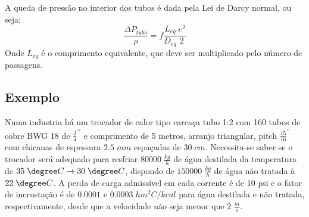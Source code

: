 A queda de pressão no interior dos tubos é dada pela Lei de Darcy normal, ou seja:
\begin{equation}\label{eq:queda_pressao_tubo}
    \frac{\Delta P_{tubo}}{\rho } = f \frac{L_{eq} }{D_{eq} }\frac{\upsilon ^{2} }{2}
\end{equation}
Onde \(L_{eq}\) é o comprimento equivalente, que deve ser multiplicado pelo número de passagens.
\par
\subsection{Exemplo}
Numa industria há um trocador de calor tipo carcaça tubo 1:2 com 160 tubos de cobre BWG 18 de
\(\frac{3}{4}^{\prime \prime}\) e comprimento de 5 metros, arranjo triangular, pitch
\(\frac{15}{16}^{\prime \prime} \) com chicanas de espessura \(2.5 \;mm\) espaçadas de \(30 \; cm\).
Necessita-se saber se o trocador será adequado para resfriar \(80000 \; \frac{kg}{h}\) de água
destilada da temperatura de \(35 \; \degree C \to 30 \; \degree C\), dispondo de \(150000 \;
\frac{kg}{h}\) de água não tratada à \(22 \; \degree C\). A perda de carga admissível em cada
corrente é de 10 psi e o fator de incrustação é de \(0.0001 \) e \(0.0003 \; h m^{2} C / kcal\) para
água destilada e não tratada, respectivamente, desde que a velocidade não seja menor que 2 \(\frac{m}{s}\).       
 
